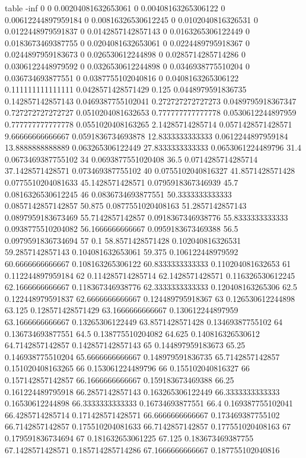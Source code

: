 table {%
-inf 0
0 0.00204081632653061
0 0.00408163265306122
0 0.00612244897959184
0 0.00816326530612245
0 0.0102040816326531
0 0.0122448979591837
0 0.0142857142857143
0 0.0163265306122449
0 0.0183673469387755
0 0.0204081632653061
0 0.0224489795918367
0 0.0244897959183673
0 0.026530612244898
0 0.0285714285714286
0 0.0306122448979592
0 0.0326530612244898
0 0.0346938775510204
0 0.036734693877551
0 0.0387755102040816
0 0.0408163265306122
0.111111111111111 0.0428571428571429
0.125 0.0448979591836735
0.142857142857143 0.0469387755102041
0.272727272727273 0.0489795918367347
0.727272727272727 0.0510204081632653
0.777777777777778 0.0530612244897959
0.777777777777778 0.0551020408163265
2.14285714285714 0.0571428571428571
9.66666666666667 0.0591836734693878
12.8333333333333 0.0612244897959184
13.8888888888889 0.063265306122449
27.8333333333333 0.0653061224489796
31.4 0.0673469387755102
34 0.0693877551020408
36.5 0.0714285714285714
37.1428571428571 0.073469387755102
40 0.0755102040816327
41.8571428571428 0.0775510204081633
45.1428571428571 0.0795918367346939
45.7 0.0816326530612245
46 0.0836734693877551
50.3333333333333 0.0857142857142857
50.875 0.0877551020408163
51.2857142857143 0.0897959183673469
55.7142857142857 0.0918367346938776
55.8333333333333 0.0938775510204082
56.1666666666667 0.0959183673469388
56.5 0.0979591836734694
57 0.1
58.8571428571428 0.102040816326531
59.2857142857143 0.104081632653061
59.375 0.106122448979592
60.6666666666667 0.108163265306122
60.8333333333333 0.110204081632653
61 0.112244897959184
62 0.114285714285714
62.1428571428571 0.116326530612245
62.1666666666667 0.118367346938776
62.3333333333333 0.120408163265306
62.5 0.122448979591837
62.6666666666667 0.124489795918367
63 0.126530612244898
63.125 0.128571428571429
63.1666666666667 0.130612244897959
63.1666666666667 0.13265306122449
63.8571428571428 0.13469387755102
64 0.136734693877551
64.5 0.138775510204082
64.625 0.140816326530612
64.7142857142857 0.142857142857143
65 0.144897959183673
65.25 0.146938775510204
65.6666666666667 0.148979591836735
65.7142857142857 0.151020408163265
66 0.153061224489796
66 0.155102040816327
66 0.157142857142857
66.1666666666667 0.159183673469388
66.25 0.161224489795918
66.2857142857143 0.163265306122449
66.3333333333333 0.16530612244898
66.3333333333333 0.16734693877551
66.4 0.169387755102041
66.4285714285714 0.171428571428571
66.6666666666667 0.173469387755102
66.7142857142857 0.175510204081633
66.7142857142857 0.177551020408163
67 0.179591836734694
67 0.181632653061225
67.125 0.183673469387755
67.1428571428571 0.185714285714286
67.1666666666667 0.187755102040816
}
